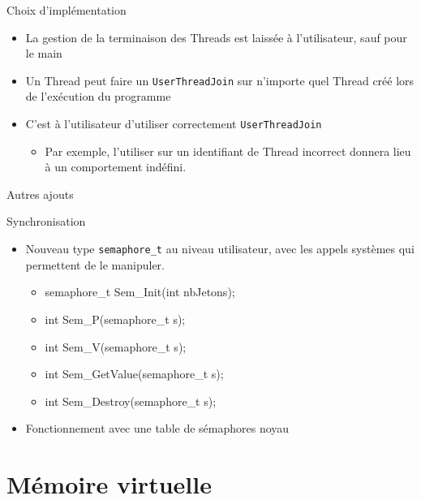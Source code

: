 \documentclass{beamer}
\begin{document}
\begin{frame}
	\begin{block}{Choix d’implémentation }
		\begin{itemize}[<+->]
			\item La gestion de la terminaison des Threads est laissée à l'utilisateur, sauf pour le main
			\item Un Thread peut faire un \texttt{UserThreadJoin} sur n'importe quel Thread créé lors de l'exécution du programme
			\item C'est à l'utilisateur d'utiliser correctement \texttt{UserThreadJoin}
			\begin{itemize}
				\item Par exemple, l'utiliser sur un identifiant de Thread incorrect donnera lieu à un comportement indéfini.
			\end{itemize}			
		\end{itemize}
	\end{block}
\end{frame}

\begin{frame}{Autres ajouts}
	\begin{block}{Synchronisation }
		\begin{itemize}
			\item<1-> Nouveau type \texttt{semaphore\_t} au niveau utilisateur, avec les appels systèmes qui permettent de le manipuler.
			\begin{itemize}
				\item<2-> semaphore\_t Sem\_Init(int nbJetons);
				\item<3-> int Sem\_P(semaphore\_t s);
				\item<4-> int Sem\_V(semaphore\_t s);
				\item<5-> int Sem\_GetValue(semaphore\_t s);
				\item<6-> int Sem\_Destroy(semaphore\_t s);
			\end{itemize}
			\item<7-> Fonctionnement avec une table de sémaphores noyau
		\end{itemize}
	\end{block}
\end{frame}



\section{Mémoire virtuelle}
\end{document}
